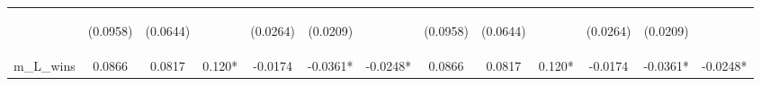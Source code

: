\documentclass[]{article}
\begin{document}
\begin{center}
\begin{tabular}{lcccccccccccc}
\vspace{4pt} & \begin{footnotesize}(0.0958)\end{footnotesize} & \begin{footnotesize}(0.0644)\end{footnotesize} & \begin{footnotesize}\end{footnotesize} & \begin{footnotesize}(0.0264)\end{footnotesize} & \begin{footnotesize}(0.0209)\end{footnotesize} & \begin{footnotesize}\end{footnotesize} & \begin{footnotesize}(0.0958)\end{footnotesize} & \begin{footnotesize}(0.0644)\end{footnotesize} & \begin{footnotesize}\end{footnotesize} & \begin{footnotesize}(0.0264)\end{footnotesize} & \begin{footnotesize}(0.0209)\end{footnotesize} & \begin{footnotesize}\end{footnotesize} \\
m\_L\_wins & 0.0866 & 0.0817 & 0.120* & -0.0174 & -0.0361* & -0.0248* & 0.0866 & 0.0817 & 0.120* & -0.0174 & -0.0361* & -0.0248* \\

\end{tabular}
\end{center}
\end{document}
